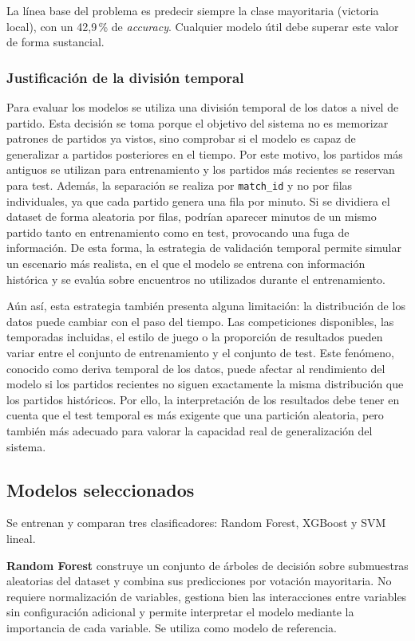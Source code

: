 La línea base del problema es predecir siempre la clase mayoritaria (victoria local), con un 42,9\,\% de \textit{accuracy}. Cualquier modelo útil debe superar este valor de forma sustancial.

\subsubsection{Justificación de la división temporal}

Para evaluar los modelos se utiliza una división temporal de los datos a nivel de partido. Esta decisión se toma porque el objetivo del sistema no es memorizar patrones de partidos ya vistos, sino comprobar si el modelo es capaz de generalizar a partidos posteriores en el tiempo. Por este motivo, los partidos más antiguos se utilizan para entrenamiento y los partidos más recientes se reservan para test. Además, la separación se realiza por \texttt{match\_id} y no por filas individuales, ya que cada partido genera una fila por minuto. Si se dividiera el dataset de forma aleatoria por filas, podrían aparecer minutos de un mismo partido tanto en entrenamiento como en test, provocando una fuga de información. De esta forma, la estrategia de validación temporal permite simular un escenario más realista, en el que el modelo se entrena con información histórica y se evalúa sobre encuentros no utilizados durante el entrenamiento.

Aún así, esta estrategia también presenta alguna limitación: la distribución de los datos puede cambiar con el paso del tiempo. Las competiciones disponibles, las temporadas incluidas, el estilo de juego o la proporción de resultados pueden variar entre el conjunto de entrenamiento y el conjunto de test. Este fenómeno, conocido como deriva temporal de los datos, puede afectar al rendimiento del modelo si los partidos recientes no siguen exactamente la misma distribución que los partidos históricos. Por ello, la interpretación de los resultados debe tener en cuenta que el test temporal es más exigente que una partición aleatoria, pero también más adecuado para valorar la capacidad real de generalización del sistema.

\subsection{Modelos seleccionados}

Se entrenan y comparan tres clasificadores: Random Forest, XGBoost y SVM lineal.

\textbf{Random Forest} construye un conjunto de árboles de decisión sobre submuestras aleatorias del dataset y combina sus predicciones por votación mayoritaria. No requiere normalización de variables, gestiona bien las interacciones entre variables sin configuración adicional y permite interpretar el modelo mediante la importancia de cada variable. Se utiliza como modelo de referencia.

